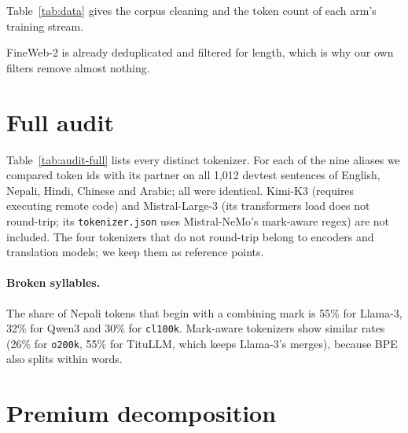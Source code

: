 Table~\ref{tab:data} gives the corpus cleaning and the token count of each arm's training stream.



FineWeb-2 is already deduplicated and filtered for length, which is why our own filters remove almost nothing.

\section{Full audit}
\label{app:audit}

Table~\ref{tab:audit-full} lists every distinct tokenizer. For each of the nine aliases we compared token ids with its partner on all 1{,}012 devtest sentences of English, Nepali, Hindi, Chinese and Arabic; all were identical. Kimi-K3 (requires executing remote code) and Mistral-Large-3 (its transformers load does not round-trip; its \texttt{tokenizer.json} uses Mistral-NeMo's mark-aware regex) are not included. The four tokenizers that do not round-trip belong to encoders and translation models; we keep them as reference points.



\paragraph{Broken syllables.} The share of Nepali tokens that begin with a combining mark is 55\% for Llama-3, 32\% for Qwen3 and 30\% for \texttt{cl100k}. Mark-aware tokenizers show similar rates (26\% for \texttt{o200k}, 55\% for TituLLM, which keeps Llama-3's merges), because BPE also splits within words.

\section{Premium decomposition}
\label{app:decomp}

